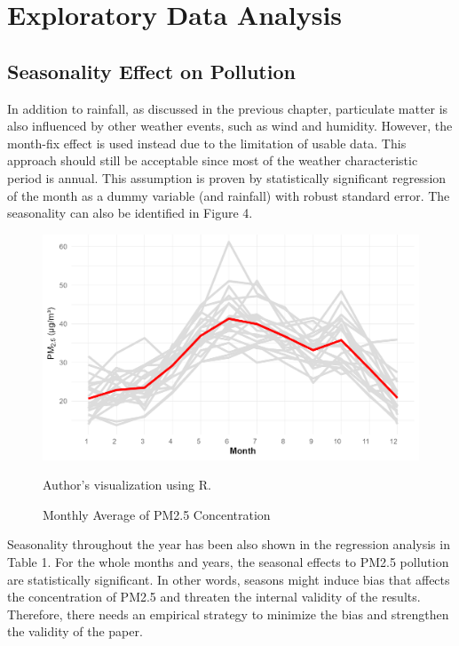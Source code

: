 \documentclass[AEJ]{AEA}
\begin{document}
\section{Exploratory Data Analysis}
\subsection{Seasonality Effect on Pollution} 

In addition to rainfall, as discussed in the previous chapter, particulate matter is also influenced by other weather events, such as wind and humidity. However, the month-fix effect is used instead due to the limitation of usable data. This approach should still be acceptable since most of the weather characteristic period is annual. This assumption is proven by statistically significant regression of the month as a dummy variable (and rainfall) with robust standard error. The seasonality can also be identified in Figure 4.

\begin{figure}
    \centering
    \includegraphics[width=0.8\linewidth]{Graphs/EDA_seasonality.png}
    \caption{Monthly Average of PM2.5 Concentration}
    \label{Seasonal PM2.5}
    \begin{figurenotes}[Source]
Author's visualization using R.
\end{figurenotes}
\end{figure}

Seasonality throughout the year has been also shown in the regression analysis in Table 1. For the whole months and years, the seasonal effects to PM2.5 pollution are statistically significant. In other words, seasons might induce bias that affects the concentration of PM2.5 and threaten the internal validity of the results. Therefore, there needs an empirical strategy to minimize the bias and strengthen the validity of the paper.
\end{document}
